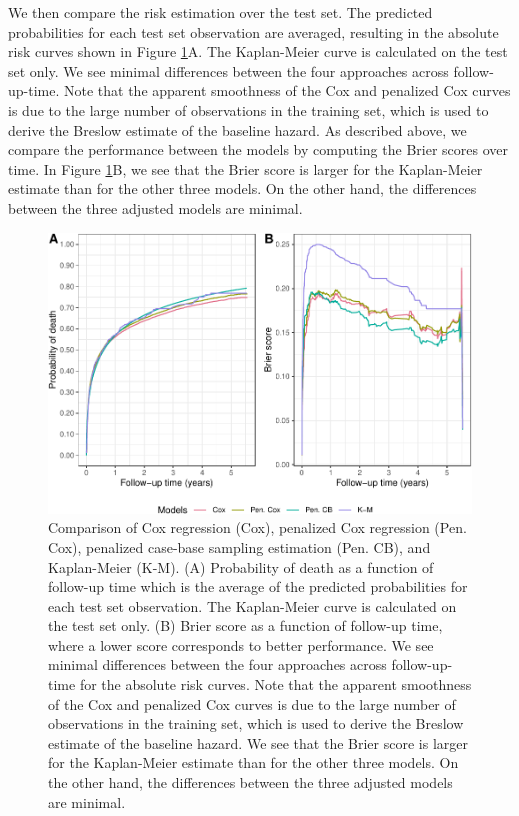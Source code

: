 We then compare the risk estimation over the test set. The predicted probabilities for each test set observation are averaged, resulting in the absolute risk curves shown in Figure \ref{fig:cs3FinalBrier}A. The Kaplan-Meier curve is calculated on the test set only. We see minimal differences between the four approaches across follow-up-time. Note that the apparent smoothness of the Cox and penalized Cox curves is due to the large number of observations in the training set, which is used to derive the Breslow estimate of the baseline hazard. As described above, we compare the performance between the models by computing the Brier scores over time. In Figure \ref{fig:cs3FinalBrier}B, we see that the Brier score is larger for the Kaplan-Meier estimate than for the other three models. On the other hand, the differences between the three adjusted models are minimal.

\begin{figure}[ht]
\includegraphics[width=\textwidth,keepaspectratio=true]{./cs3FinalBrier-1} \caption{Comparison of Cox regression (Cox), penalized Cox regression (Pen. Cox), penalized case-base sampling estimation (Pen. CB), and Kaplan-Meier (K-M). (A) Probability of death as a function of follow-up time which is the average of the predicted probabilities for each test set observation. The Kaplan-Meier curve is calculated on the test set only. (B) Brier score as a function of follow-up time, where a lower score corresponds to better performance. We see minimal differences between the four approaches across follow-up-time for the absolute risk curves. Note that the apparent smoothness of the Cox and penalized Cox curves is due to the large number of observations in the training set, which is used to derive the Breslow estimate of the baseline hazard. We see that the Brier score is larger for the Kaplan-Meier estimate than for the other three models. On the other hand, the differences between the three adjusted models are minimal.}\label{fig:cs3FinalBrier}
\end{figure}

